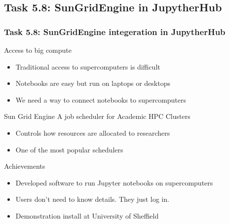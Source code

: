 \documentclass{beamer}
\begin{document}
\subsection{Task 5.8: SunGridEngine in JupytherHub}
\begin{frame}
  \frametitle{Task 5.8: SunGridEngine integeration in JupytherHub}
  \begin{block}{Access to big compute}
   \begin{itemize}
   \item Traditional access to supercomputers is difficult
   \item Notebooks are easy but run on laptops or desktops
   \item We need a way to connect notebooks to supercomputers
   \end{itemize}
  \end{block}
  \begin{block}{Sun Grid Engine}
    A job scheduler for Academic HPC Clusters
    \begin{itemize}
    \item Controls how resources are allocated to researchers
    \item One of the most popular schedulers
    \end{itemize}
  \end{block}

  \begin{block}{Achievements}
  \begin{itemize}
  \item Developed software to run Jupyter notebooks on supercomputers
  \item Users don't need to know details. They just log in.
  \item Demonstration install at University of Sheffield
  \end{itemize}
  \end{block}
\end{frame}

\end{document}
